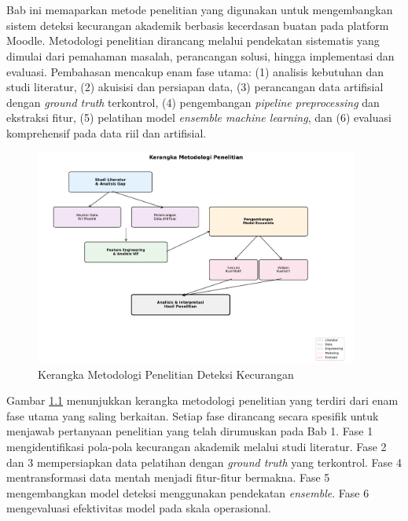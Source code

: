 \chapter{\babTiga}
\label{bab:3}
Bab ini memaparkan metode penelitian yang digunakan untuk mengembangkan sistem deteksi kecurangan akademik berbasis kecerdasan buatan pada platform Moodle. Metodologi penelitian dirancang melalui pendekatan sistematis yang dimulai dari pemahaman masalah, perancangan solusi, hingga implementasi dan evaluasi. Pembahasan mencakup enam fase utama: (1) analisis kebutuhan dan studi literatur, (2) akuisisi dan persiapan data, (3) perancangan data artifisial dengan \textit{ground truth} terkontrol, (4) pengembangan \textit{pipeline preprocessing} dan ekstraksi fitur, (5) pelatihan model \textit{ensemble machine learning}, dan (6) evaluasi komprehensif pada data riil dan artifisial.

\begin{figure}[htbp]
    \centering
    \includegraphics[width=0.95\textwidth]{newfigures/research_methodology_stages.pdf}
    \caption{Kerangka Metodologi Penelitian Deteksi Kecurangan}
    \label{fig:research_stages}
\end{figure}

Gambar \ref{fig:research_stages} menunjukkan kerangka metodologi penelitian yang terdiri dari enam fase utama yang saling berkaitan. Setiap fase dirancang secara spesifik untuk menjawab pertanyaan penelitian yang telah dirumuskan pada Bab 1. Fase 1 mengidentifikasi pola-pola kecurangan akademik melalui studi literatur. Fase 2 dan 3 mempersiapkan data pelatihan dengan \textit{ground truth} yang terkontrol. Fase 4 mentransformasi data mentah menjadi fitur-fitur bermakna. Fase 5 mengembangkan model deteksi menggunakan pendekatan \textit{ensemble}. Fase 6 mengevaluasi efektivitas model pada skala operasional.

